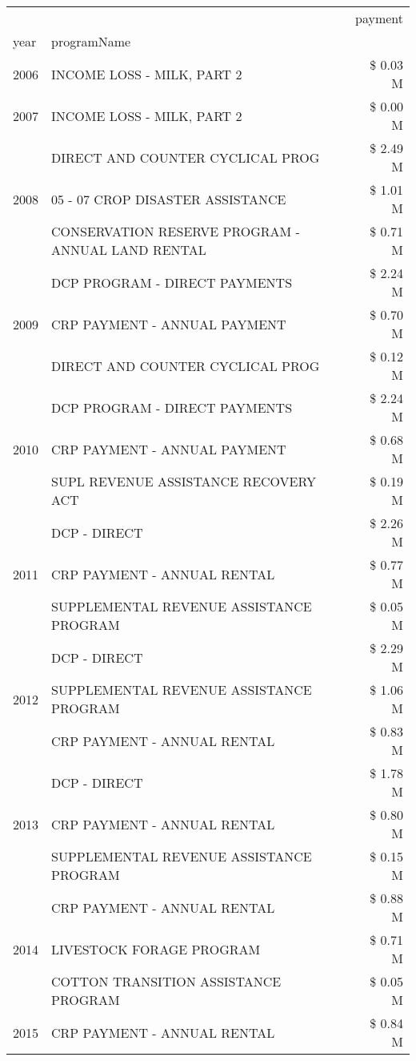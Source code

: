 \begin{tabular}{llr}
\toprule
 &  & payment \\
year & programName &  \\
\midrule
2006 & INCOME LOSS - MILK, PART 2 & \$ 0.03 M \\
\cline{1-3}
2007 & INCOME LOSS - MILK, PART 2 & \$ 0.00 M \\
\cline{1-3}
\multirow[t]{3}{*}{2008} & DIRECT AND COUNTER CYCLICAL PROG & \$ 2.49 M \\
 & 05 - 07 CROP DISASTER ASSISTANCE & \$ 1.01 M \\
 & CONSERVATION RESERVE PROGRAM - ANNUAL LAND RENTAL & \$ 0.71 M \\
\cline{1-3}
\multirow[t]{3}{*}{2009} & DCP PROGRAM - DIRECT PAYMENTS & \$ 2.24 M \\
 & CRP PAYMENT - ANNUAL PAYMENT & \$ 0.70 M \\
 & DIRECT AND COUNTER CYCLICAL PROG & \$ 0.12 M \\
\cline{1-3}
\multirow[t]{3}{*}{2010} & DCP PROGRAM - DIRECT PAYMENTS & \$ 2.24 M \\
 & CRP PAYMENT - ANNUAL PAYMENT & \$ 0.68 M \\
 & SUPL REVENUE ASSISTANCE RECOVERY ACT & \$ 0.19 M \\
\cline{1-3}
\multirow[t]{3}{*}{2011} & DCP - DIRECT & \$ 2.26 M \\
 & CRP PAYMENT - ANNUAL RENTAL & \$ 0.77 M \\
 & SUPPLEMENTAL REVENUE ASSISTANCE PROGRAM & \$ 0.05 M \\
\cline{1-3}
\multirow[t]{3}{*}{2012} & DCP - DIRECT & \$ 2.29 M \\
 & SUPPLEMENTAL REVENUE ASSISTANCE PROGRAM & \$ 1.06 M \\
 & CRP PAYMENT - ANNUAL RENTAL & \$ 0.83 M \\
\cline{1-3}
\multirow[t]{3}{*}{2013} & DCP - DIRECT & \$ 1.78 M \\
 & CRP PAYMENT - ANNUAL RENTAL & \$ 0.80 M \\
 & SUPPLEMENTAL REVENUE ASSISTANCE PROGRAM & \$ 0.15 M \\
\cline{1-3}
\multirow[t]{3}{*}{2014} & CRP PAYMENT - ANNUAL RENTAL & \$ 0.88 M \\
 & LIVESTOCK FORAGE PROGRAM & \$ 0.71 M \\
 & COTTON TRANSITION ASSISTANCE PROGRAM & \$ 0.05 M \\
\cline{1-3}
\multirow[t]{3}{*}{2015} & CRP PAYMENT - ANNUAL RENTAL & \$ 0.84 M \\

\end{tabular}
